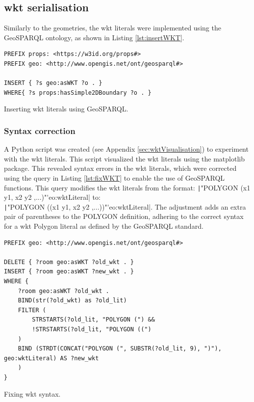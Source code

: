 \subsection{\acs{wkt} serialisation}

Similarly to the geometries, the \ac{wkt} literals were implemented using the GeoSPARQL ontology, as shown in Listing \ref{lst:insertWKT}.

\begin{listing}[H]
    \begin{verbatim}
PREFIX props: <https://w3id.org/props#>
PREFIX geo: <http://www.opengis.net/ont/geosparql#>

INSERT { ?s geo:asWKT ?o . }
WHERE{ ?s props:hasSimple2DBoundary ?o . }
    \end{verbatim}
    \caption[Inserting \acs{wkt} literals]{Inserting \acs{wkt} literals using GeoSPARQL.}
    \label{lst:insertWKT}
\end{listing}

\subsubsection{Syntax correction}

A Python script was created (see Appendix \ref{sec:wktVisualisation}) to experiment with the \ac{wkt} literals. This script visualized the \ac{wkt} literals using the matplotlib package. This revealed syntax errors in the \ac{wkt} literals, which were corrected using the query in Listing \ref{lst:fixWKT} to enable the use of GeoSPARQL functions. This query modifies the \ac{wkt} literals from the format: \texttt|"POLYGON (x1 y1, x2 y2 ,...)"^^geo:wktLiteral| to:\\
\texttt|"POLYGON ((x1 y1, x2 y2 ,...))"^^geo:wktLiteral|. The adjustment adds an extra pair of parentheses to the POLYGON definition, adhering to the correct syntax for a \ac{wkt} Polygon literal as defined by the GeoSPARQL standard.

\begin{listing}[H]
    \begin{verbatim}
PREFIX geo: <http://www.opengis.net/ont/geosparql#>

DELETE { ?room geo:asWKT ?old_wkt . }
INSERT { ?room geo:asWKT ?new_wkt . }
WHERE {
    ?room geo:asWKT ?old_wkt .
    BIND(str(?old_wkt) as ?old_lit)
    FILTER (
        STRSTARTS(?old_lit, "POLYGON (") &&
        !STRSTARTS(?old_lit, "POLYGON ((")
    )
    BIND (STRDT(CONCAT("POLYGON (", SUBSTR(?old_lit, 9), ")"), geo:wktLiteral) AS ?new_wkt
    )
}
    \end{verbatim}
    \caption{Fixing \acs{wkt} syntax.}
    \label{lst:fixWKT}
\end{listing}

